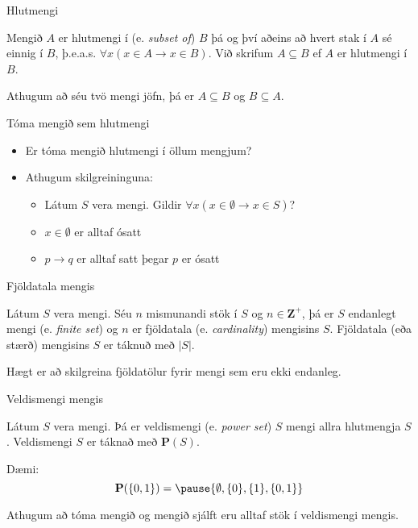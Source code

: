 \documentclass[handout]{beamer}
\begin{document}
\begin{frame}{Hlutmengi}
\begin{tcolorbox}[title=Hlutmengi]
Mengið $A$ er hlutmengi í (e. \emph{subset of}) $B$ þá og því aðeins að hvert stak í $A$ sé einnig í $B$, þ.e.a.s. $\forall x (x \in A \to x \in B)$. Við skrifum $A \subseteq B$ ef $A$ er hlutmengi í $B$.
\end{tcolorbox}

Athugum að séu tvö mengi jöfn, þá er $A \subseteq B$ og $B \subseteq A$.
\end{frame}

\begin{frame}{Tóma mengið sem hlutmengi}
\begin{itemize}
 \item Er tóma mengið hlutmengi í öllum mengjum? \pause
 \item Athugum skilgreininguna:
 \begin{itemize}
  \item Látum $S$ vera mengi. Gildir $\forall x (x \in \emptyset \to x \in S)$? \pause
  \item $x \in \emptyset$ er alltaf ósatt \pause
  \item $p \to q$ er alltaf satt þegar $p$ er ósatt
 \end{itemize}
\end{itemize}
\end{frame}

\begin{frame}{Fjöldatala mengis}
\begin{tcolorbox}[title=Fjöldatala]
Látum $S$ vera mengi. Séu $n$ mismunandi stök í $S$ og $n \in \mathbf{Z^+}$, þá er $S$ endanlegt mengi (e. \emph{finite set}) og $n$ er fjöldatala (e. \emph{cardinality}) mengisins $S$. Fjöldatala (eða stærð) mengisins $S$ er táknuð með $|S|$.
\end{tcolorbox}
Hægt er að skilgreina fjöldatölur fyrir mengi sem eru ekki endanleg.
\end{frame}

\begin{frame}{Veldismengi mengis}
\begin{tcolorbox}[title=Veldismengi]
Látum $S$ vera mengi. Þá er veldismengi (e. \emph{power set}) $S$ mengi allra hlutmengja $S$. Veldismengi $S$ er táknað með $\mathbf{P}(S)$.
\end{tcolorbox}
Dæmi: \[\mathbf{P}(\{0, 1\}) = \pause \{\emptyset, \{0\}, \{1\}, \{0, 1\}\}\]

Athugum að tóma mengið og mengið sjálft eru alltaf stök í veldismengi mengis.
\end{frame}
\end{document}
